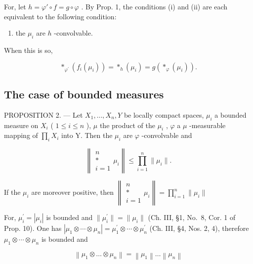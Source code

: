For, let \(h = \varphi' \circ f = g \circ \varphi\) . By Prop. 1, the conditions (i) and (ii) are each equivalent to the following condition:

\begin{enumerate}
\def\labelenumi{(\roman{enumi})}
\setcounter{enumi}{2}
\tightlist
\item
  the \(\mu_{i}\) are \(h\) -convolvable.
\end{enumerate}

When this is so,

\[
\left. \ast_ {\varphi^ {\prime}} \left(f _ {i} \left(\mu_ {i}\right)\right) = \ast_ {h} \left(\mu_ {i}\right) = g \left(\ast_ {\varphi} \left(\mu_ {i}\right)\right). \right.
\]

\subsection{The case of bounded measures}

PROPOSITION 2. --- Let \(X_{1},\ldots,X_{n},Y\) be locally compact spaces, \(\mu_{i}\) a bounded measure on \(X_{i}\) ( \(1\leqslant i\leqslant n\) ), \(\mu\) the product of the \(\mu_{i}\) , \(\varphi\) a \(\mu\) -measurable mapping of \(\prod_{i}X_{i}\) into Y. Then the \(\mu_{i}\) are \(\varphi\) -convolvable and

\[
\left\| \begin{array}{c} n \\ * \\ i = 1 \end{array} \mu_ {i} \right\| \leqslant \prod_ {i = 1} ^ {n} \| \mu_ {i} \|.
\]

If the \(\mu_{i}\) are moreover positive, then \(\left\| \begin{array}{c}n\\ *\\ i = 1 \end{array} \mu_i\right\| = \prod_{i = 1}^{n}\| \mu_{i}\|\)

For, \(\mu_{i}^{\prime}=|\mu_{i}|\) is bounded and \(\|\mu_{i}^{\prime}\|=\|\mu_{i}\|\) (Ch. III, §1, No.~8, Cor. 1 of Prop. 10). One has \(|\mu_{1}\otimes\cdots\otimes\mu_{n}|=\mu_{1}^{\prime}\otimes\cdots\otimes\mu_{n}^{\prime}\) (Ch. III, §4, Nos. 2, 4), therefore \(\mu_{1}\otimes\cdots\otimes\mu_{n}\) is bounded and

\[
\left\| \mu_ {1} \otimes \dots \otimes \mu_ {n} \right\| = \left\| \mu_ {1} \right\| \dots \left\| \mu_ {n} \right\|
\]

